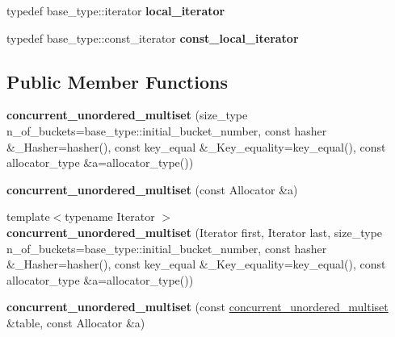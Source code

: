 \begin{DoxyCompactItemize}
\item 
\hypertarget{classtbb_1_1interface5_1_1concurrent__unordered__multiset_a532cdc67028e27231846b41bfd9a0e26}{}typedef base\+\_\+type\+::iterator {\bfseries local\+\_\+iterator}\label{classtbb_1_1interface5_1_1concurrent__unordered__multiset_a532cdc67028e27231846b41bfd9a0e26}

\item 
\hypertarget{classtbb_1_1interface5_1_1concurrent__unordered__multiset_af4f42202dd9f2bc114c9411928431217}{}typedef base\+\_\+type\+::const\+\_\+iterator {\bfseries const\+\_\+local\+\_\+iterator}\label{classtbb_1_1interface5_1_1concurrent__unordered__multiset_af4f42202dd9f2bc114c9411928431217}

\end{DoxyCompactItemize}
\subsection*{Public Member Functions}
\begin{DoxyCompactItemize}
\item 
\hypertarget{classtbb_1_1interface5_1_1concurrent__unordered__multiset_afa7c1f095ac1f56c7811811aabe6b77c}{}{\bfseries concurrent\+\_\+unordered\+\_\+multiset} (size\+\_\+type n\+\_\+of\+\_\+buckets=base\+\_\+type\+::initial\+\_\+bucket\+\_\+number, const hasher \&\+\_\+\+Hasher=hasher(), const key\+\_\+equal \&\+\_\+\+Key\+\_\+equality=key\+\_\+equal(), const allocator\+\_\+type \&a=allocator\+\_\+type())\label{classtbb_1_1interface5_1_1concurrent__unordered__multiset_afa7c1f095ac1f56c7811811aabe6b77c}

\item 
\hypertarget{classtbb_1_1interface5_1_1concurrent__unordered__multiset_adf8c095a7be6913dd96e22a6ce9af187}{}{\bfseries concurrent\+\_\+unordered\+\_\+multiset} (const Allocator \&a)\label{classtbb_1_1interface5_1_1concurrent__unordered__multiset_adf8c095a7be6913dd96e22a6ce9af187}

\item 
\hypertarget{classtbb_1_1interface5_1_1concurrent__unordered__multiset_a2eede1ccad9975aac7acbffbd991e26c}{}{\footnotesize template$<$typename Iterator $>$ }\\{\bfseries concurrent\+\_\+unordered\+\_\+multiset} (Iterator first, Iterator last, size\+\_\+type n\+\_\+of\+\_\+buckets=base\+\_\+type\+::initial\+\_\+bucket\+\_\+number, const hasher \&\+\_\+\+Hasher=hasher(), const key\+\_\+equal \&\+\_\+\+Key\+\_\+equality=key\+\_\+equal(), const allocator\+\_\+type \&a=allocator\+\_\+type())\label{classtbb_1_1interface5_1_1concurrent__unordered__multiset_a2eede1ccad9975aac7acbffbd991e26c}

\item 
\hypertarget{classtbb_1_1interface5_1_1concurrent__unordered__multiset_a229089da66522fd4f3d77e9f57e19fbb}{}{\bfseries concurrent\+\_\+unordered\+\_\+multiset} (const \hyperlink{classtbb_1_1interface5_1_1concurrent__unordered__multiset}{concurrent\+\_\+unordered\+\_\+multiset} \&table, const Allocator \&a)\label{classtbb_1_1interface5_1_1concurrent__unordered__multiset_a229089da66522fd4f3d77e9f57e19fbb}

\end{DoxyCompactItemize}


